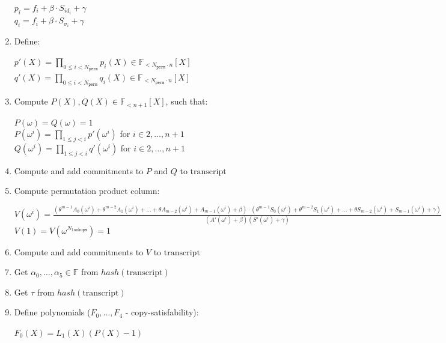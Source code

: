 \begin{enumerate}
\begin{center}
            $p_i = f_i + \beta \cdot S_{id_i} + \gamma$ \\
            $q_i = f_i + \beta \cdot S_{\sigma_i} + \gamma$
        \end{center}
    \item Define:
        \begin{center}
            $p'(X) = \prod\limits_{0 \leq i < N_{\texttt{perm}}} p_i(X) \in \mathbb{F}_{<N_{\texttt{perm}} \cdot n}[X]$ \\
            $q'(X) = \prod\limits_{0 \leq i < N_{\texttt{perm}}} q_i(X) \in \mathbb{F}_{<N_{\texttt{perm}} \cdot n}[X]$
        \end{center}
    \item Compute $P(X), Q(X) \in \mathbb{F}_{<n+1}[X]$, such that:
        \begin{center}
            $P(\omega) = Q(\omega) = 1$ \\
            $P(\omega^i) = \prod\limits_{1 \leq j < i}p'(\omega^i)$ for $i \in {2, \dots, n + 1}$ \\
            $Q(\omega^i) = \prod\limits_{1 \leq j < i}q'(\omega^i)$ for $i \in {2, \dots, n + 1}$ \\
        \end{center}
    \item Compute and add commitments to $P$ and $Q$ to $\text{transcript}$
    \item Compute permutation product column:
        \begin{center}
            $V (\omega^i) = \frac{(\theta^{m-1} A_0(\omega^i) + \theta^{m-2} A_1(\omega^i) + ... + \theta A_{m-2}(\omega^i) + A_{m-1}(\omega^i) + \beta) \cdot (\theta^{m-1} S_0(\omega^i) + \theta^{m-2} S_1(\omega^i) + ... + \theta S_{m-2}(\omega^i) + S_{m-1}(\omega^i) + \gamma)} {(A'(\omega^i) + \beta) (S'(\omega^i) + \gamma)}$ \\
            $V (1) = V (\omega^{N_{\texttt{lookups}}}) = 1$
        \end{center}
    \item Compute and add commitments to $V$ to $\text{transcript}$
    \item Get $\alpha_0, \dots, \alpha_5 \in \mathbb{F}$ from $hash(\text{transcript})$
    \item Get $\tau$ from $hash(\text{transcript})$
    \item Define polynomials ($F_0, \dots, F_4$ - copy-satisfability):
        \begin{center}
            $F_0(X) = L_1(X)(P(X) - 1)$\\

\end{center}
\end{enumerate}
